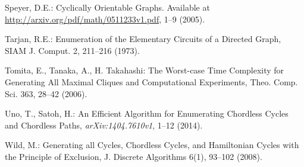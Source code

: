 \documentclass{lawcg}
\begin{document}
\begin{thebibliography}{}
 Speyer, D.E.: Cyclically Orientable Graphs. Available at \url{http://arxiv.org/pdf/math/0511233v1.pdf}, 1--9 (2005).



 Tarjan, R.E.: Enumeration of the Elementary Circuits of a Directed Graph, SIAM J. Comput. 2, 211--216 (1973).

 Tomita, E., Tanaka, A., H. Takahashi: The Worst-case Time Complexity for Generating All Maximal Cliques and Computational Experiments, Theo. Comp. Sci. 363, 28--42 (2006).



 Uno, T., Satoh, H.: An Efficient Algorithm for Enumerating Chordless Cycles and Chordless Paths, {\it arXiv:1404.7610v1}, 1--12 (2014).

 Wild, M.: Generating all Cycles, Chordless Cycles, and Hamiltonian Cycles with the Principle of Exclusion, J. Discrete Algorithms 6(1), 93--102 (2008).

\end{thebibliography}
\end{document}
